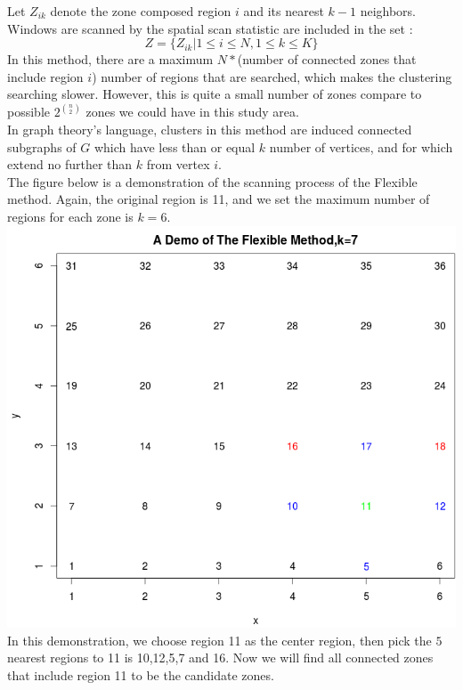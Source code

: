 \documentclass[12pt]{article}
\begin{document}
\begin{enumerate}
				Let $Z_{ik}$ denote the zone composed region $i$ and its nearest ${k-1}$ neighbors. Windows are scanned by the spatial scan statistic are included in the set : \\
		\[
			Z = \{Z_{ik} | 1 \leq i \leq N, 1 \leq k \leq K \}
		\] 
				In this method, there are a maximum $N*$(number of connected zones that include region $i$) number of regions that are searched, which makes the clustering searching slower. However, this is quite a small number of zones compare to possible $2^{\binom{n}{2}}$ zones we could have in this study area. \\
			
			In graph theory's language, clusters in this method are induced connected subgraphs of $G$ which have less than or equal $k$ number of vertices, and for which extend no further than $k$ from vertex $i$.\\
			 	
	
	The figure below is a demonstration of the scanning process of the Flexible method. Again, the original region is 11, and we set the maximum number of regions for each zone is $k=6$.\\
	\includegraphics[scale=0.5]{demo_3} \\
	In this demonstration, we choose region 11 as the center region, then pick the $5$ nearest regions to 11 is 10,12,5,7 and 16. Now we will find all connected zones that include region 11 to be the candidate zones.  \\  
	

\end{enumerate}
\end{document}
